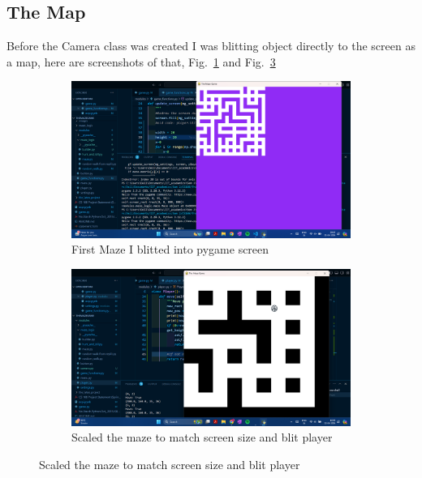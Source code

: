\documentclass{article}
\begin{document}
\subsection{The Map}
Before the Camera class was created I was blitting object directly to the screen as a map, here are screenshots of that, Fig.~\ref{fig:map1} and Fig.~\ref{fig:map2}
\begin{figure}[h]
    \caption[1]{}
    \begin{subfigure}[b]{0.5\textwidth}
        \centering
        \includegraphics[width=\textwidth]{screenshots/Screenshot (168).png}
        \caption[(a)]{First Maze I blitted into pygame screen}
        \label{fig:map1}
    \end{subfigure}
    \begin{subfigure}[b]{0.5\textwidth}
        \centering
        \includegraphics[width=\textwidth]{screenshots/Screenshot (169).png}
        \caption[(a)]{Scaled the maze to match screen size and blit player}
        \label{fig:map2}
    \end{subfigure}
\end{figure}
\end{document}
